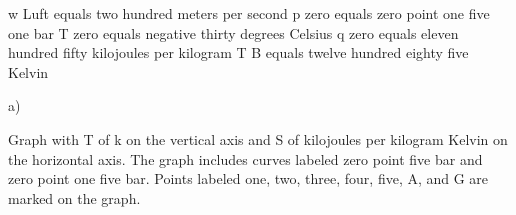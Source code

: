 w Luft equals two hundred meters per second  
p zero equals zero point one five one bar  
T zero equals negative thirty degrees Celsius  
q zero equals eleven hundred fifty kilojoules per kilogram  
T B equals twelve hundred eighty five Kelvin  

a)

Graph with T of k on the vertical axis and S of kilojoules per kilogram Kelvin on the horizontal axis. The graph includes curves labeled zero point five bar and zero point one five bar. Points labeled one, two, three, four, five, A, and G are marked on the graph.